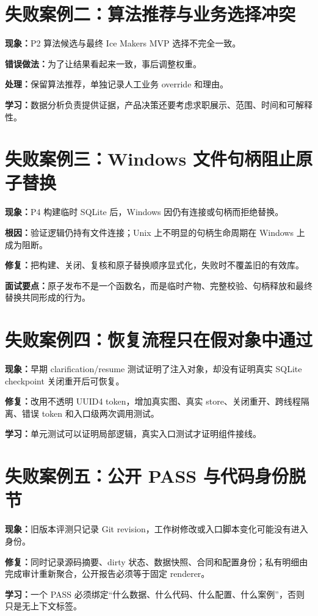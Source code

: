 \section{失败案例二：算法推荐与业务选择冲突}

\textbf{现象：}P2 算法候选与最终 Ice Makers MVP 选择不完全一致。\par
\textbf{错误做法：}为了让结果看起来一致，事后调整权重。\par
\textbf{处理：}保留算法推荐，单独记录人工业务 override 和理由。\par
\textbf{学习：}数据分析负责提供证据，产品决策还要考虑求职展示、范围、时间和可解释性。

\section{失败案例三：Windows 文件句柄阻止原子替换}

\textbf{现象：}P4 构建临时 SQLite 后，Windows 因仍有连接或句柄而拒绝替换。\par
\textbf{根因：}验证逻辑仍持有文件连接；Unix 上不明显的句柄生命周期在 Windows 上成为阻断。\par
\textbf{修复：}把构建、关闭、复核和原子替换顺序显式化，失败时不覆盖旧的有效库。\par
\textbf{面试要点：}原子发布不是一个函数名，而是临时产物、完整校验、句柄释放和最终替换共同形成的行为。

\section{失败案例四：恢复流程只在假对象中通过}

\textbf{现象：}早期 clarification/resume 测试证明了注入对象，却没有证明真实 SQLite checkpoint 关闭重开后可恢复。\par
\textbf{修复：}改用不透明 UUID4 token，增加真实图、真实 store、关闭重开、跨线程隔离、错误 token 和入口级两次调用测试。\par
\textbf{学习：}单元测试可以证明局部逻辑，真实入口测试才证明组件接线。

\section{失败案例五：公开 PASS 与代码身份脱节}

\textbf{现象：}旧版本评测只记录 Git revision，工作树修改或入口脚本变化可能没有进入身份。\par
\textbf{修复：}同时记录源码摘要、dirty 状态、数据快照、合同和配置身份；私有明细由完成审计重新聚合，公开报告必须等于固定 renderer。\par
\textbf{学习：}一个 PASS 必须绑定“什么数据、什么代码、什么配置、什么案例”，否则只是无上下文标签。

